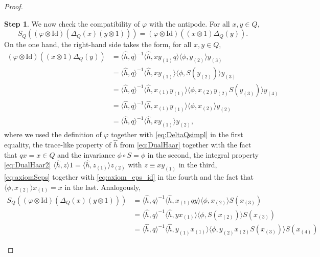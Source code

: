 \documentclass[a4paper,10pt]{amsart}
\newcommand{\eval}[2]{\langle #1 , #2\rangle}
\theoremstyle{definition}
\newtheorem{step-hypergroup}{Step}
\begin{document}
\begin{proof}
\begin{step-hypergroup}
    We now check the compatibility of $\varphi$ with the antipode. 
    For all $x,y\in Q$, 
    \[
    S_Q((\varphi \otimes \mathrm{Id})(\Delta_Q(x)(y\otimes 1)))
    =
    (\varphi \otimes \mathrm{Id})((x\otimes 1)\Delta_Q(y)).
    \]
    On the one hand, the right-hand side takes the form, for all $x,y\in Q$,
    \begin{align*}
        (\varphi \otimes \mathrm{Id})((x\otimes 1)\Delta_Q(y))
        &=
            \eval{\hat{h}}{q}^{-1}\eval{\hat{h}}{xy_{(1)}q}
                \eval{\phi}{y_{(2)}} y_{(3)}
        \\
        &=
            \eval{\hat{h}}{q}^{-1}\eval{\hat{h}}{xy_{(1)}}
                \eval{\phi}{S(y_{(2)})} y_{(3)}
        \\
        &=
            \eval{\hat{h}}{q}^{-1}\eval{\hat{h}}{x_{(1)}y_{(1)}}
                \eval{\phi}{x_{(2)}y_{(2)}S(y_{(3)})} y_{(4)}
        \\
        &=
            \eval{\hat{h}}{q}^{-1}\eval{\hat{h}}{x_{(1)}y_{(1)}}
                \eval{\phi}{x_{(2)}} y_{(2)}
        \\
        &=
            \eval{\hat{h}}{q}^{-1}\eval{\hat{h}}{xy_{(1)}} y_{(2)},
    \end{align*}
    where we used the definition of $\varphi$ together with \cref{eq:DeltaQsimpl} in the first equality, the trace-like property of $\hat{h}$ from \cref{eq:DualHaar} together with the fact that $qx=x\in Q$ and the invariance $\phi \circ S= \phi$ in the second, the integral property \cref{eq:DualHaar2} $\eval{\hat{h}}{z}1=\eval{\hat{h}}{z_{(1)}}z_{(2)}$ with $z\equiv xy_{(1)}$ in the third, \cref{eq:axiomSeps} together with \cref{eq:axiom_eps_id} in the fourth and the fact that $\eval{\phi}{x_{(2)}}x_{(1)}=x$ in the last. Analogously,
    \begin{align*}
        S_Q((\varphi \otimes \mathrm{Id})(\Delta_Q(x)(y\otimes 1)))
        &=
            \eval{\hat{h}}{q}^{-1}
                \eval{\hat{h}}{x_{(1)}qy}
                    \eval{\phi}{x_{(2)}}
                        S(x_{(3)})\\
        &=
            \eval{\hat{h}}{q}^{-1}
                \eval{\hat{h}}{yx_{(1)}}
                    \eval{\phi}{S(x_{(2)})}
                        S(x_{(3)})
        \\
        &=
            \eval{\hat{h}}{q}^{-1}
                \eval{\hat{h}}{y_{(1)}x_{(1)}}
                    \eval{\phi}{y_{(2)}x_{(2)}S(x_{(3)})}
                        S(x_{(4)})

\end{align*}
\end{step-hypergroup}
\end{proof}
\end{document}
